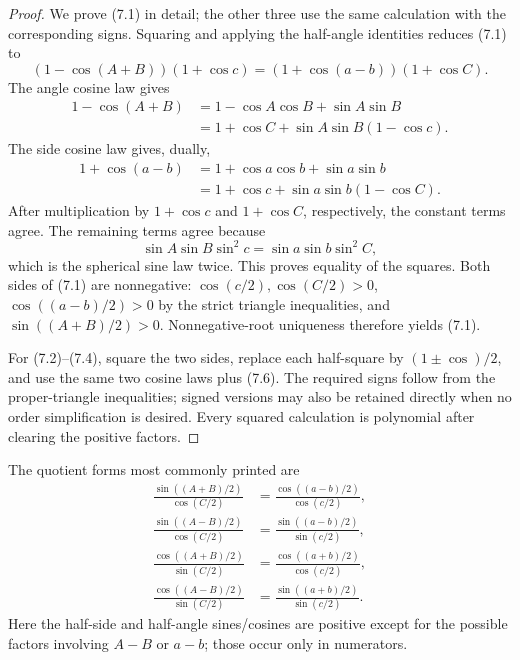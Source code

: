 \begin{proof}
We prove (7.1) in detail; the other three use the same calculation with the
corresponding signs.  Squaring and applying the half-angle identities reduces
(7.1) to
\begin{equation}
 (1-\cos(A+B))(1+\cos c)
 =(1+\cos(a-b))(1+\cos C).                                 \tag{7.5}
\end{equation}
The angle cosine law gives
\begin{align*}
 1-\cos(A+B)
 &=1-\cos A\cos B+\sin A\sin B\\
 &=1+\cos C+\sin A\sin B(1-\cos c).
\end{align*}
The side cosine law gives, dually,
\begin{align*}
 1+\cos(a-b)
 &=1+\cos a\cos b+\sin a\sin b\\
 &=1+\cos c+\sin a\sin b(1-\cos C).
\end{align*}
After multiplication by \(1+\cos c\) and \(1+\cos C\), respectively, the
constant terms agree.  The remaining terms agree because
\begin{equation}
 \sin A\sin B\sin^2c=\sin a\sin b\sin^2C,                 \tag{7.6}
\end{equation}
which is the spherical sine law twice.  This proves equality of the squares.
Both sides of (7.1) are nonnegative: \(\cos(c/2),\cos(C/2)>0\),
\(\cos((a-b)/2)>0\) by the strict triangle inequalities, and
\(\sin((A+B)/2)>0\).  Nonnegative-root uniqueness therefore yields (7.1).

For (7.2)--(7.4), square the two sides, replace each half-square by
\((1\pm\cos)/2\), and use the same two cosine laws plus (7.6).  The required
signs follow from the proper-triangle inequalities; signed versions may also
be retained directly when no order simplification is desired.  Every squared
calculation is polynomial after clearing the positive factors.
\end{proof}

The quotient forms most commonly printed are
\begin{align}
 \frac{\sin((A+B)/2)}{\cos(C/2)}
 &=\frac{\cos((a-b)/2)}{\cos(c/2)},                         \tag{7.7}\\
 \frac{\sin((A-B)/2)}{\cos(C/2)}
 &=\frac{\sin((a-b)/2)}{\sin(c/2)},                         \tag{7.8}\\
 \frac{\cos((A+B)/2)}{\sin(C/2)}
 &=\frac{\cos((a+b)/2)}{\cos(c/2)},                         \tag{7.9}\\
 \frac{\cos((A-B)/2)}{\sin(C/2)}
 &=\frac{\sin((a+b)/2)}{\sin(c/2)}.                         \tag{7.10}
\end{align}
Here the half-side and half-angle sines/cosines are positive except for the
possible factors involving \(A-B\) or \(a-b\); those occur only in numerators.

